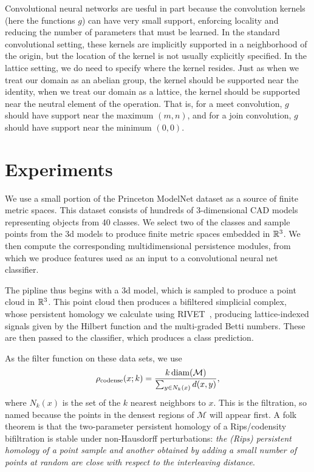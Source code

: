 \documentclass{article}
\begin{document}
Convolutional neural networks are uesful in part because the convolution kernels
(here the functions $g$) can have very small support, enforcing locality and
reducing the number of parameters that must be learned. In the standard
convolutional setting, these kernels are implicitly supported in a neighborhood
of the origin, but the location of the kernel is not usually explicitly
specified. In the lattice setting, we do need to specify where the kernel
resides. Just as when we treat our domain as an abelian group, the kernel should
be supported near the identity, when we treat our domain as a lattice, the
kernel should be supported near the neutral element of the operation. That is,
for a meet convolution, $g$ should have support near the maximum $(m,n)$, and
for a join convolution, $g$ should have support near the minimum $(0,0)$.







\section{Experiments}
We use a small portion of the Princeton ModelNet dataset as a source of finite
metric spaces. This dataset consists of hundreds of 3-dimensional CAD models
representing objects from 40 classes. We select two of the classes and sample
points from the 3d models to produce finite metric spaces embedded in $\mathbb{R}^3$.
We then compute the corresponding multidimensional persistence modules, from
which we produce features used as an input to a convolutional neural net
classifier.

The pipline thus begins with a 3d model, which is sampled to produce a point
cloud in $\mathbb{R}^3$. This point cloud then produces a bifiltered simplicial complex,
whose persistent homology we calculate using RIVET~\cite{lesnick_interactive_2015}, producing
lattice-indexed signals given by the Hilbert function and the multi-graded Betti
numbers. These are then passed to the classifier, which produces a class prediction.

As the filter function on these data sets, we use
\[\rho_{\text{codense}}(x;k) = \frac{k \operatorname{diam}(\mathcal M)}{\sum_{y \in N_k(x)}
    d(x,y)},\]
where $N_k(x)$ is the set of the $k$ nearest neighbors to $x$. This is the
 filtration, so named because the points in the densest
regions of $\mathcal M$ will appear first. A folk theorem is that the
two-parameter persistent homology of a Rips/codensity bifiltration is stable
under non-Hausdorff perturbations: \textit{the (Rips) persistent homology of a
  point sample and another obtained by adding a small number of points at random
are close with respect to the interleaving distance}.
\end{document}
